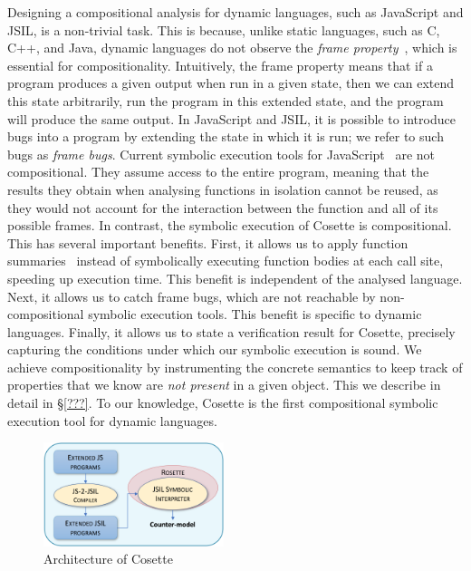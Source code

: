 \documentclass[acmsmall,review,anonymous]{acmart}\settopmatter{printfolios=true,printccs=false,printacmref=false}
\newcommand{\jsil}{JSIL\xspace}
\newcommand{\jilette}{Cosette\xspace}
\newcommand{\myparagraph}[1]{\smallskip\noindent {\bf #1.}\hspace{1pt}}
\begin{document}
\myparagraph{Novelty: Compositionality} 
Designing a compositional analysis for dynamic languages, such as JavaScript and \jsil, is a non-trivial task. This is because, unlike static languages, such as C, C++, and Java, dynamic languages do not observe the \emph{frame property}~\cite{?}, which is essential for compositionality. Intuitively, the frame property means that if a program produces a given output when run in a given state, then we can extend this state arbitrarily, run the program in this extended state, and the program will produce the same output. In JavaScript and \jsil, it is possible to introduce bugs into a program by extending the state in which it is run; we refer to such bugs as \emph{frame bugs}. 
%
Current symbolic execution tools for JavaScript~\cite{???} are not compositional. They assume access to the entire program, meaning that the results they obtain when analysing functions in isolation cannot be reused, as they would not account for the interaction between the function and all of its possible frames.
%
In contrast, the symbolic execution of \jilette is compositional. This has several important benefits.
%
First, it allows us to apply function summaries~\cite{???} instead of symbolically executing function bodies at each call site, speeding up execution time. This benefit is independent of the analysed language.
%
Next, it allows us to catch frame bugs, which are not reachable by non-compositional symbolic execution tools. This benefit is specific to dynamic languages.
%
Finally, it allows us to state a verification result for \jilette, precisely capturing the conditions under which our symbolic execution is sound.
%
We achieve compositionality by instrumenting the concrete semantics to keep track of properties that we know are {\em not present} in a given object. This we describe in detail in \S\ref{???}. To our knowledge, \jilette is the first compositional symbolic execution tool for dynamic languages.

\begin{figure}
\vspace*{-0.45cm}
\centering
\includegraphics[width=0.47\textwidth]{figures/jilette_blue.png}
\vspace*{-0.23cm}
\caption{Architecture of \jilette}
\vspace*{-0.4cm}
\label{fig:jilette:diagram}
\end{figure}
\end{document}
